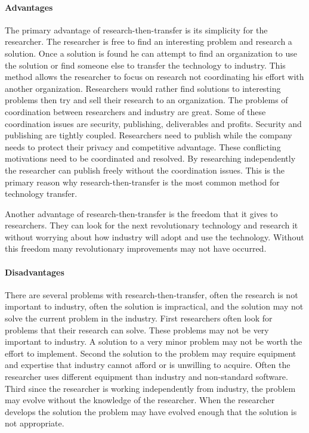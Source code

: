 \paragraph{Advantages}

The primary advantage of research-then-transfer is its simplicity for the
researcher.  The researcher is free to find an interesting problem and
research a solution.  Once a solution is found he can attempt to find an
organization to use the solution or find someone else to transfer the
technology to industry.  This method allows the researcher to focus on
research not coordinating his effort with another organization.
Researchers would rather find solutions to interesting problems then try
and sell their research to an organization.  The problems of coordination
between researchers and industry are great.  Some of these coordination
issues are security, publishing, deliverables and profits.  Security and
publishing are tightly coupled.  Researchers need to publish while the
company needs to protect their privacy and competitive advantage.  These
conflicting motivations need to be coordinated and resolved.  By
researching independently the researcher can publish freely without the
coordination issues.  This is the primary reason why research-then-transfer
is the most common method for technology transfer.

Another advantage of research-then-transfer is the freedom that it gives to
researchers.  They can look for the next revolutionary technology and
research it without worrying about how industry will adopt and use the
technology.  Without this freedom many revolutionary improvements may not
have occurred.

\paragraph{Disadvantages}

There are several problems with research-then-transfer, often the research
is not important to industry, often the solution is impractical, and the
solution may not solve the current problem in the industry.  First
researchers often look for problems that their research can solve.  These
problems may not be very important to industry.  A solution to a very minor
problem may not be worth the effort to implement.  Second the solution to
the problem may require equipment and expertise that industry cannot afford
or is unwilling to acquire.  Often the researcher uses different equipment
than industry and non-standard software.  Third since the researcher is
working independently from industry, the problem may evolve without the
knowledge of the researcher.  When the researcher develops the solution the
problem may have evolved enough that the solution is not appropriate.

